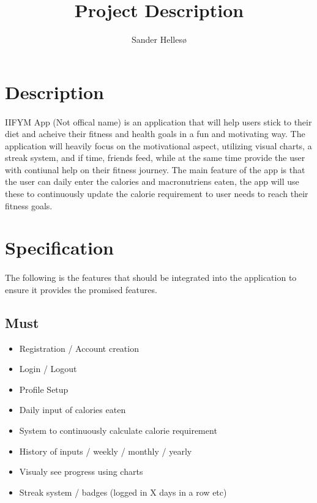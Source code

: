 \documentclass{article}
\title{Project Description}
\author{Sander Hellesø}
\begin{document}
  
  \setcounter{page}{1}
  
  \section{Description}
    \paragraph{}
    IIFYM App (Not offical name) is an application that will help users stick to their diet and acheive their fitness and health goals in a fun and motivating way.
    The application will heavily focus on the motivational aspect, utilizing visual charts, a streak system, and if time, friends feed, while
    at the same time provide the user with contiunal help on their fitness journey. The main feature of the app is that the user can daily enter 
    the calories and macronutriens eaten, the app will use these to continuously update the calorie requirement to user needs to reach their
    fitness goals.
    
    \hfill \break

  \section{Specification}
    \paragraph{}
    The following is the features that should be integrated into the application to ensure it provides the promised features.

      \subsection{Must}
        \begin{itemize}
          \item Registration / Account creation
          \item Login / Logout
          \item Profile Setup
          \item Daily input of calories eaten
          \item System to continuously calculate calorie requirement
          \item History of inputs / weekly / monthly / yearly
          \item Visualy see progress using charts
          \item Streak system / badges (logged in X days in a row etc)
        \end{itemize}
\end{document}
